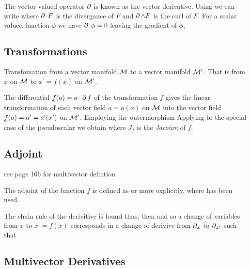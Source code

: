 The vector-valued operator $\operatorname{\partial}$ is known as the vector derivative.
Using 
we can write
where $\operatorname{\partial} \cdot F$ is the divergance of $F$ and $\operatorname{\partial}\wedge F$ is the curl
of $F$.
For a scalar valued function $\phi$ we have $\operatorname{\partial}\cdot \phi = 0$
leaving the gradient of $\phi$,
\eq{
  \d\phi = \d \wedge \phi
}

\subsection{Transformations}

Transfomation from a vector manifold ${\cal M}$ to a vector manifold ${\cal M}^\prime$.
That is from $x$ on ${\cal M}$ to $x^\prime = f(x)$ on ${\cal M}^\prime$.

The differential $\underline{f}(a) = a \cdot \operatorname{\partial} f$ of the transformation $f$
gives the linear transformation of each vector field $a = a(x)$ on
${\cal M}$ into the vector field $\underline{f}(a) = a^\prime = a^\prime(x^\prime)$
on ${\cal M}^\prime$.
Employing the outermorphism
Applying to the special case of the pseudoscalar we obtain
where $J_f$ is the {\em Jacoian} of $f$.

\subsection{Adjoint}
see page 166 for multivector defintion 

The adjoint of the function $f$ 
is defined as
or more explicitly,
where  has been used.

The chain rule of the derivitive is found thus,
then
and so a change of variables from $x$ to $x^\prime = f(x)$
corresponds in a change of derivive from $\operatorname{\partial}_x$ to $\operatorname{\partial}_{x^\prime}$
such that

\subsection{Multivector Derivatives}

